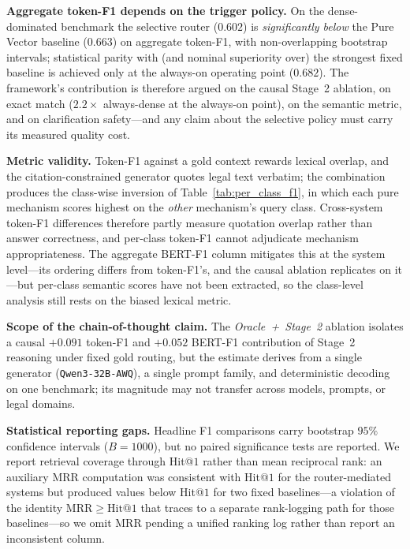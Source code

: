 \documentclass[pdflatex,sn-mathphys-num]{sn-jnl}
\begin{document}
\noindent\textbf{Aggregate token-F1 depends on the trigger policy.} On the
dense-dominated benchmark the selective router ($0.602$) is
\emph{significantly below} the Pure Vector baseline ($0.663$) on aggregate
token-F1, with non-overlapping bootstrap intervals; statistical parity with
(and nominal superiority over) the strongest fixed baseline is achieved only
at the always-on operating point ($0.682$). The framework's contribution is
therefore argued on the causal Stage~2 ablation, on exact match
($2.2\times$ always-dense at the always-on point), on the semantic metric,
and on clarification safety---and any claim about the selective policy must
carry its measured quality cost.

\noindent\textbf{Metric validity.} Token-F1 against a gold context rewards
lexical overlap, and the citation-constrained generator quotes legal text
verbatim; the combination produces the class-wise inversion of
Table~\ref{tab:per_class_f1}, in which each pure mechanism scores highest on
the \emph{other} mechanism's query class. Cross-system token-F1 differences
therefore partly measure quotation overlap rather than answer correctness,
and per-class token-F1 cannot adjudicate mechanism appropriateness. The
aggregate BERT-F1 column mitigates this at the system level---its ordering
differs from token-F1's, and the causal ablation replicates on it---but
per-class semantic scores have not been extracted, so the class-level
analysis still rests on the biased lexical metric.

\noindent\textbf{Scope of the chain-of-thought claim.} The
\textit{Oracle~+~Stage~2} ablation isolates a causal $+0.091$ token-F1 and
$+0.052$ BERT-F1 contribution of Stage~2 reasoning under fixed gold routing,
but the estimate derives from a single generator (\texttt{Qwen3-32B-AWQ}), a
single prompt family, and deterministic decoding on one benchmark; its
magnitude may not transfer across models, prompts, or legal domains.

\noindent\textbf{Statistical reporting gaps.} Headline F1 comparisons carry
bootstrap $95\%$ confidence intervals ($B=1000$), but no paired significance
tests are reported. We report retrieval coverage through Hit@$1$ rather than
mean reciprocal rank: an auxiliary MRR computation was consistent with Hit@$1$
for the router-mediated systems but produced values below Hit@$1$ for two
fixed baselines---a violation of the identity $\mathrm{MRR}\ge\mathrm{Hit@1}$
that traces to a separate rank-logging path for those baselines---so we omit
MRR pending a unified ranking log rather than report an inconsistent column.
\end{document}
